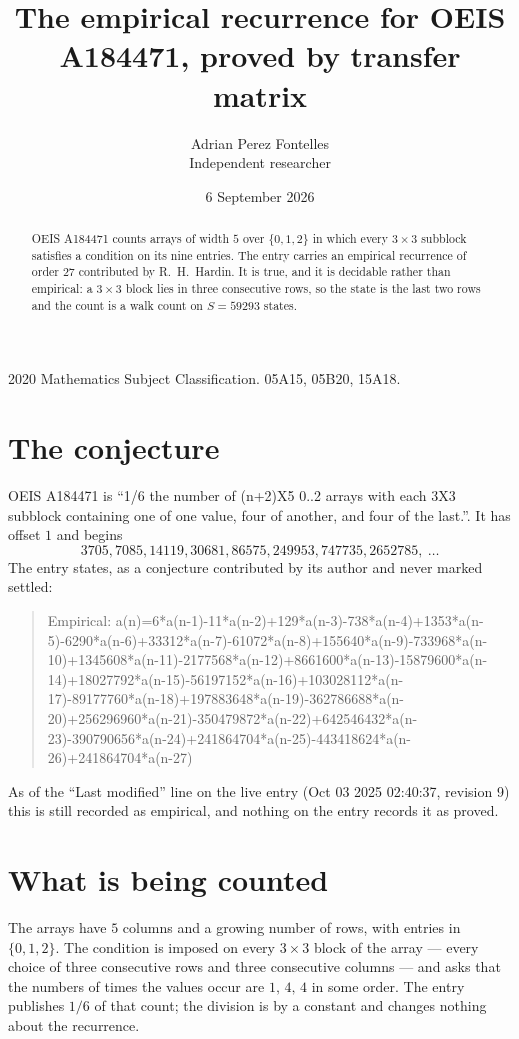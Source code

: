 \documentclass[11pt,a4paper]{article}
\title{The empirical recurrence for OEIS A184471, proved by transfer matrix}
\author{Adrian Perez Fontelles\\ \small Independent researcher}
\date{6 September 2026}
\theoremstyle{plain}
\theoremstyle{definition}
\begin{document}
\maketitle

\begin{abstract}
OEIS A184471 counts arrays of width $5$ over $\{0,1,2\}$ in which every $3\times3$ subblock
satisfies a condition on its nine entries. The entry carries an empirical recurrence of order
$27$ contributed by R.~H.~Hardin. It is true, and it is decidable rather than empirical: a
$3\times3$ block lies in three consecutive rows, so the state is the last two rows and the
count is a walk count on $S=59293$ states.
\end{abstract}

\noindent\small 2020 Mathematics Subject Classification. 05A15, 05B20, 15A18.\normalsize

\section{The conjecture}

OEIS A184471 is ``1/6 the number of (n+2)X5 0..2 arrays with each 3X3 subblock containing one of one value, four of another, and four of the last.''. It has offset $1$ and begins
\[
3705, 7085, 14119, 30681, 86575, 249953, 747735, 2652785,\ \dots
\]
The entry states, as a conjecture contributed by its author and never marked settled:
\begin{quote}
Empirical: a(n)=6*a(n-1)-11*a(n-2)+129*a(n-3)-738*a(n-4)+1353*a(n-5)-6290*a(n-6)+33312*a(n-7)-61072*a(n-8)+155640*a(n-9)-733968*a(n-10)+1345608*a(n-11)-2177568*a(n-12)+8661600*a(n-13)-15879600*a(n-14)+18027792*a(n-15)-56197152*a(n-16)+103028112*a(n-17)-89177760*a(n-18)+197883648*a(n-19)-362786688*a(n-20)+256296960*a(n-21)-350479872*a(n-22)+642546432*a(n-23)-390790656*a(n-24)+241864704*a(n-25)-443418624*a(n-26)+241864704*a(n-27)
\end{quote}
As of the ``Last modified'' line on the live entry (Oct 03 2025 02:40:37, revision 9) this is still
recorded as empirical, and nothing on the entry records it as proved.

\section{What is being counted}

The arrays have $5$ columns and a growing number of rows, with entries in $\{0,1,2\}$. The
condition is imposed on every $3\times3$ block of the array --- every choice of three
consecutive rows and three consecutive columns --- and asks that the numbers of times the values occur are $1,\,4,\,4$ in some order. The entry publishes $1/6$ of that count; the division is by a constant and changes nothing about the recurrence.
\end{document}
